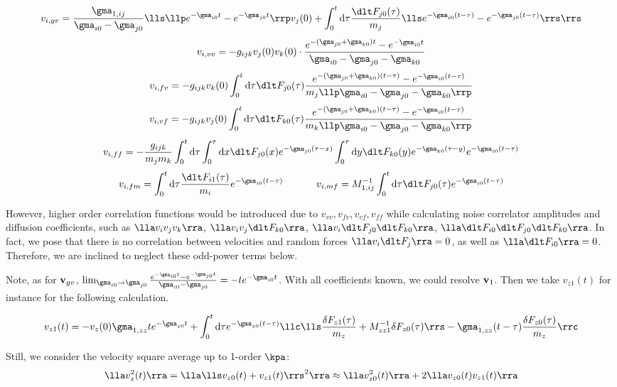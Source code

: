 \documentclass[fleqn,10pt]{InternshipReport_SI-ENS-PSL}
\begin{document}
$$  v_{i,gv} = \frac{\gma_{1,ij}}{\gma_{i0} - \gma_{j0}} \lls \llp e^{- \gma_{i0} t} - e^{-\gma_{j0} t} \rrp v_j (0) + \int_0^t \mrm{d}\tau \frac{\dlt F_{j0}(\tau)}{m_j} \lls e^{- \gma_{i0} (t-\tau)} - e^{-\gma_{j0} (t-\tau)} \rrs \rrs $$
$$ v_{i,vv} = - g_{ijk} v_j (0) v_k (0) \cdot \frac{e^{-(\gma_{j0} + \gma_{k0}) t} - e^{-\gma_{i0} t}}{\gma_{i0} - \gma_{j0} - \gma_{k0}} $$
$$ v_{i,fv} = - g_{ijk} v_k (0) \int_0^t \mrm{d}\tau \dlt F_{j0} (\tau) \frac{e^{-(\gma_{j0} + \gma_{k0}) (t-\tau)} - e^{-\gma_{i0} (t-\tau)}}{m_j \llp \gma_{i0} - \gma_{j0} - \gma_{k0} \rrp} $$
$$ v_{i,vf} = - g_{ijk} v_j (0) \int_0^t \mrm{d}\tau \dlt F_{k0} (\tau) \frac{e^{-(\gma_{j0} + \gma_{k0}) (t-\tau)} - e^{-\gma_{i0} (t-\tau)}}{m_k \llp \gma_{i0} - \gma_{j0} - \gma_{k0} \rrp} $$
$$ v_{i,ff} = - \frac{g_{ijk}}{m_j m_k} \int_0^t \mrm{d}\tau  \int_0^\tau \mrm{d}x \dlt F_{j0} (x) e^{-\gma_{j0} (\tau - x)}  \int_0^\tau \mrm{d}y \dlt F_{k0} (y) e^{-\gma_{k0} (\tau - y)} e^{- \gma_{i0} (t-\tau)} $$ 
$$ v_{i,fm} = \int_0^t \mrm{d}\tau \frac{\dlt F_{i1} (\tau)}{m_i} e^{-\gma_{i0} (t-\tau)} \tens
 v_{i,mf} = M^{-1}_{1,ij} \int_0^t \mrm{d}\tau \dlt F_{j0} (\tau) e^{-\gma_{i0} (t-\tau)} $$

However, higher order correlation functions would be introduced due to $v_{vv}, v_{fv}, v_{vf}, v_{ff}$ while calculating noise correlator amplitudes and diffusion coefficients, such as $\lla v_i v_j v_k \rra$, $\lla v_i v_j \dlt F_{k0} \rra$, $\lla v_i \dlt F_{j0} \dlt F_{k0} \rra$, $\lla \dlt F_{i0} \dlt F_{j0} \dlt F_{k0} \rra$. In fact, we pose that there is no correlation between velocities and random forces $\lla v_i \dlt F_j \rra = 0$, as well as $\lla \dlt F_{i0} \rra = 0$. Therefore, we are inclined to neglect these odd-power terms below.

Note, as for $\mathbf{v}_{gv}$, %
$ \lim_{\gma_{i0} \to \gma_{j0}} \frac{e^{- \gma_{i0} t} - e^{-\gma_{j0} t}}{\gma_{i0} - \gma_{j0}} = - t e^{-\gma_{i0} t} $. With all coefficients known, we could resolve $\mathbf{v}_1$. Then we take $v_{z1}(t)$ for instance for the following calculation.

$$ v_{z1}(t) = - v_z(0) \gma_{1,zz} t e^{-\gma_{z0}t} + \int_0^t \mrm{d}\tau e^{-\gma_{z0} (t-\tau)} \llc \lls \frac{\delta F_{z1}(\tau)}{m_z} + M^{-1}_{zz1} \delta F_{z0}(\tau) \rrs - \gma_{1,zz} (t-\tau) \frac{\delta F_{z0}(\tau)}{m_z} \rrc $$

Still, we consider the velocity square average up to 1-order $\kpa$:
$$ \lla v_z^2(t) \rra = \lla \lls v_{z0}(t) + v_{z1}(t) \rrs^2 \rra \approx \lla v_{z0}^2(t) \rra + 2 \lla v_{z0}(t) v_{z1}(t) \rra $$
\end{document}
